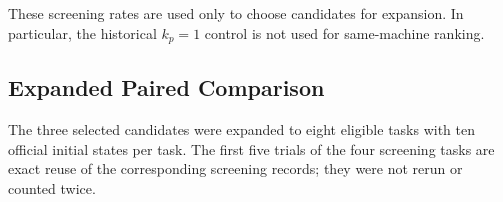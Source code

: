 \begin{table}[H]
    \centering
    \scriptsize
    \setlength{\tabcolsep}{4pt}
    \caption{Per-task outcomes during logarithmic $k_p$ screening.}
    \label{tab:dreamzero-kp-screening}
\end{table}

These screening rates are used only to choose candidates for expansion. In
particular, the historical $k_p=1$ control is not used for same-machine
ranking.

\subsection{Expanded Paired Comparison}

The three selected candidates were expanded to eight eligible tasks with ten
official initial states per task. The first five trials of the four screening
tasks are exact reuse of the corresponding screening records; they were not
rerun or counted twice.

